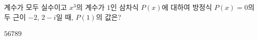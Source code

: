 계수가 모두 실수이고 $x^3$의 계수가 $1$인 삼차식 $P(x)$에 대하여 방정식 $P(x)=0$의 두 근이 $-2$, $2-i$일 때, $P(1)$의 값은?
\begin{choices32}{$5$}{$6$}{$7$}{$8$}{$9$}\end{choices32}
